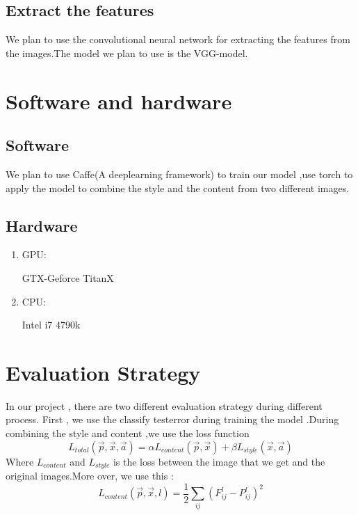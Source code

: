 \documentclass[10pt,a4paper]{article}
\begin{document}
	\subsection{Extract the features}
	We plan to use the convolutional neural network for extracting the 
	features from the images.The model we plan to use is the VGG-model.
	\section{Software and hardware}
	\subsection{Software}
	We plan to use Caffe\cite{jia2014caffe}(A deeplearning framework) to train our model ,use torch to apply the model 
	to combine the style and the content from two different images.
	\subsection{Hardware}
	\begin{enumerate}
		\item GPU:
		
		GTX-Geforce TitanX
		
		\item CPU:
		
		Intel i7 4790k
	\end{enumerate}
	\section{Evaluation Strategy}
	In our project , there are two different evaluation strategy during different process.
	First , we use the classify testerror  during training the model .During combining the 
	style and content  ,we use the loss function 
	\begin{equation}
	L_{total}( \overrightarrow{p},\overrightarrow{x},\overrightarrow{a}) = \alpha L_{content}(\overrightarrow{p},\overrightarrow{x})+\beta L_{style}(\overrightarrow{x},\overrightarrow{a})
	\end{equation}
	Where $L_{content}$ and $L_{style}$ is the loss between the image that
	we get  and the original images.More over, we use this :
	\begin{equation}
	L_{content} (\overrightarrow{p},\overrightarrow{x},l)= \frac{1}{2} \sum_{ij}
	(F_{ij}^{l}-P_{ij}^{l})^2
	\end{equation}
	
	
	
\end{document}
